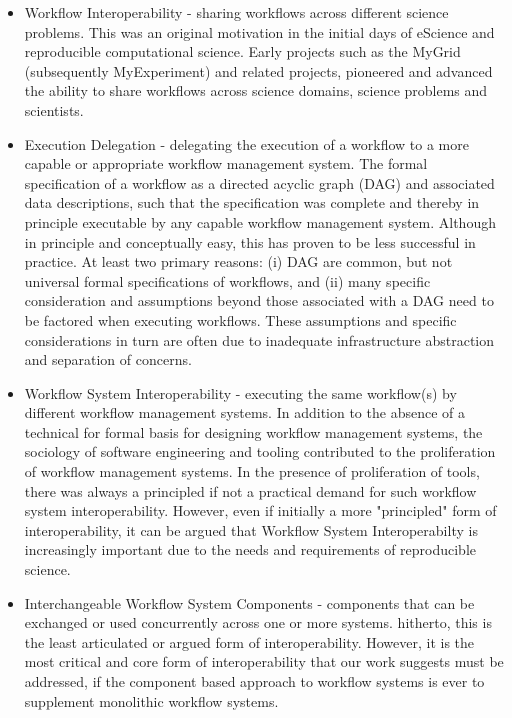 \begin{itemize}

\item Workflow Interoperability - sharing workflows across different science
problems. This was an original motivation in the initial days of eScience  and
reproducible computational science. Early projects such as the MyGrid
(subsequently MyExperiment) and related projects, pioneered and advanced the
ability to share workflows across science domains, science  problems and
scientists.

\item Execution Delegation - delegating the execution of a workflow to a more
capable or appropriate workflow management system. The formal specification of
a workflow as a directed acyclic graph (DAG) and associated data descriptions, 
such that the specification was complete and thereby in principle executable
by any capable workflow management system.  Although in principle and
conceptually easy, this has proven to be less successful in practice. At least
two primary reasons: (i) DAG are common, but not universal formal specifications
of workflows, and (ii) many specific consideration and assumptions beyond those
associated with a DAG need to be factored when executing workflows. These
assumptions and specific considerations in turn are often due to inadequate
infrastructure abstraction and separation of concerns. 

\item Workflow System Interoperability - executing the same workflow(s) by
different workflow management systems. In addition to the absence of a
technical for formal basis for designing workflow management systems, the
sociology of software engineering and tooling contributed to the proliferation
of workflow management systems. In the presence of proliferation of tools,
there was always a principled if not a practical demand for such workflow
system interoperability. However, even if initially a  more  "principled" form
of interoperability, it can be argued that Workflow System Interoperabilty is
increasingly important due to the needs and requirements of reproducible
science.

\item Interchangeable Workflow System Components - components that can be
exchanged or used concurrently across one or more systems. hitherto, this is
the least articulated or argued form of interoperability. However, it is
the most critical and core form of interoperability that our work suggests 
must be addressed, if the component based approach to workflow systems is
ever to supplement monolithic workflow systems.

\end{itemize} 


